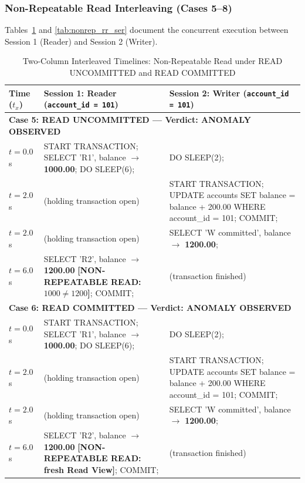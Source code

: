 \documentclass[sigconf, pbalance, nonacm]{acmart}
\begin{document}
\subsubsection{Non-Repeatable Read Interleaving (Cases 5--8)}
Tables~\ref{tab:nonrep_ru_rc} and \ref{tab:nonrep_rr_ser} document the concurrent execution between Session 1 (Reader) and Session 2 (Writer).

\begin{table}[t]
\centering
\small
\caption{Two-Column Interleaved Timelines: Non-Repeatable Read under READ UNCOMMITTED and READ COMMITTED}
\label{tab:nonrep_ru_rc}
\begin{tabularx}{\textwidth}{p{1.8cm} X X}
\toprule
\textbf{Time ($t_x$)} & \textbf{Session 1: Reader (\texttt{account\_id = 101})} & \textbf{Session 2: Writer (\texttt{account\_id = 101})} \\
\midrule
\multicolumn{3}{l}{\textbf{Case 5: READ UNCOMMITTED --- Verdict: ANOMALY OBSERVED}} \\
$t = 0.0$s & START TRANSACTION; SELECT 'R1', balance $\rightarrow$ \textbf{1000.00}; DO SLEEP(6); & DO SLEEP(2); \\
$t = 2.0$s & (holding transaction open) & START TRANSACTION; UPDATE accounts SET balance = balance + 200.00 WHERE account\_id = 101; COMMIT; \\
$t = 2.0$s & (holding transaction open) & SELECT 'W committed', balance $\rightarrow$ \textbf{1200.00}; \\
$t = 6.0$s & SELECT 'R2', balance $\rightarrow$ \textbf{1200.00} \textbf{[NON-REPEATABLE READ: $1000 \ne 1200$]}; COMMIT; & (transaction finished) \\
\midrule
\multicolumn{3}{l}{\textbf{Case 6: READ COMMITTED --- Verdict: ANOMALY OBSERVED}} \\
$t = 0.0$s & START TRANSACTION; SELECT 'R1', balance $\rightarrow$ \textbf{1000.00}; DO SLEEP(6); & DO SLEEP(2); \\
$t = 2.0$s & (holding transaction open) & START TRANSACTION; UPDATE accounts SET balance = balance + 200.00 WHERE account\_id = 101; COMMIT; \\
$t = 2.0$s & (holding transaction open) & SELECT 'W committed', balance $\rightarrow$ \textbf{1200.00}; \\
$t = 6.0$s & SELECT 'R2', balance $\rightarrow$ \textbf{1200.00} \textbf{[NON-REPEATABLE READ: fresh Read View]}; COMMIT; & (transaction finished) \\
\bottomrule
\end{tabularx}
\end{table}
\end{document}
